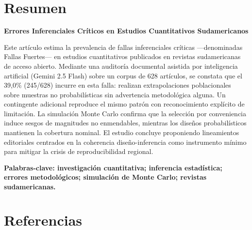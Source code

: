 \documentclass[11pt,twoside]{article}
\newcommand{\TituloES}{Errores Inferenciales Críticos en Estudios Cuantitativos Sudamericanos}
\newcommand{\AbsBlock}[4]{%
  \section*{#1}%
  {\bfseries\large #2\par}%
  #3\par
  \vspace{4pt}%
  {\bfseries #4}%
  \vspace{8pt}%
}
\begin{document}
\AbsBlock{Resumen}{\TituloES}{%
Este artículo estima la prevalencia de fallas inferenciales críticas —denominadas Fallas Fuertes— en estudios cuantitativos publicados en revistas sudamericanas de acceso abierto. Mediante una auditoría documental asistida por inteligencia artificial (Gemini 2.5 Flash) sobre un corpus de 628 artículos, se constata que el 39,0\% (245/628) incurre en esta falla: realizan extrapolaciones poblacionales sobre muestras no probabilísticas sin advertencia metodológica alguna. Un contingente adicional reproduce el mismo patrón con reconocimiento explícito de limitación. La simulación Monte Carlo confirma que la selección por conveniencia induce sesgos de magnitudes no enmendables, mientras los diseños probabilísticos mantienen la cobertura nominal. El estudio concluye proponiendo lineamientos editoriales centrados en la coherencia diseño-inferencia como instrumento mínimo para mitigar la crisis de reproducibilidad regional.%
}{\textbf{Palabras-clave:} investigación cuantitativa; inferencia estadística; errores metodológicos; simulación de Monte Carlo; revistas sudamericanas.}










\newpage
\FloatBarrier
\section*{Referencias}


\end{document}
